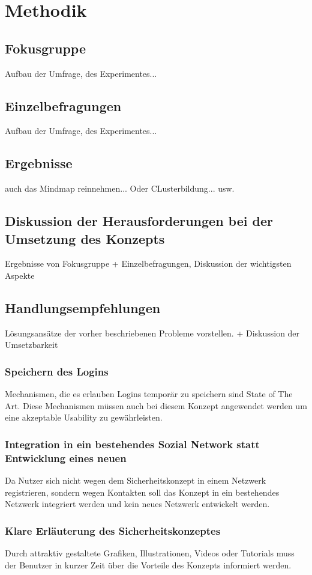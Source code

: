 \documentclass{sigchi}
\begin{document}
\section{Methodik}

\subsection{Fokusgruppe}
Aufbau der Umfrage, des Experimentes... 
\subsection{Einzelbefragungen}
Aufbau der Umfrage, des Experimentes... 

\subsection{Ergebnisse}
auch das Mindmap reinnehmen... Oder CLusterbildung... usw.

\subsection{Diskussion der Herausforderungen bei der Umsetzung des Konzepts}
Ergebnisse von Fokusgruppe + Einzelbefragungen, Diskussion der wichtigsten Aspekte  
\subsection{Handlungsempfehlungen}
Lösungsansätze der vorher beschriebenen Probleme vorstellen. + Diskussion der Umsetzbarkeit
\subsubsection{Speichern des Logins}
Mechanismen, die es erlauben Logins temporär zu speichern sind State of The Art. Diese Mechanismen müssen auch bei diesem Konzept angewendet werden um eine akzeptable Usability zu gewährleisten.
\subsubsection{Integration in ein bestehendes Sozial Network statt Entwicklung eines neuen}
Da Nutzer sich nicht wegen dem Sicherheitskonzept in einem Netzwerk registrieren, sondern wegen Kontakten soll das Konzept in ein bestehendes Netzwerk integriert werden und kein neues Netzwerk entwickelt werden.
\subsubsection{Klare Erläuterung des Sicherheitskonzeptes}
Durch attraktiv gestaltete Grafiken, Illustrationen, Videos oder Tutorials muss der Benutzer in kurzer Zeit über die Vorteile des Konzepts informiert werden.
\end{document}
